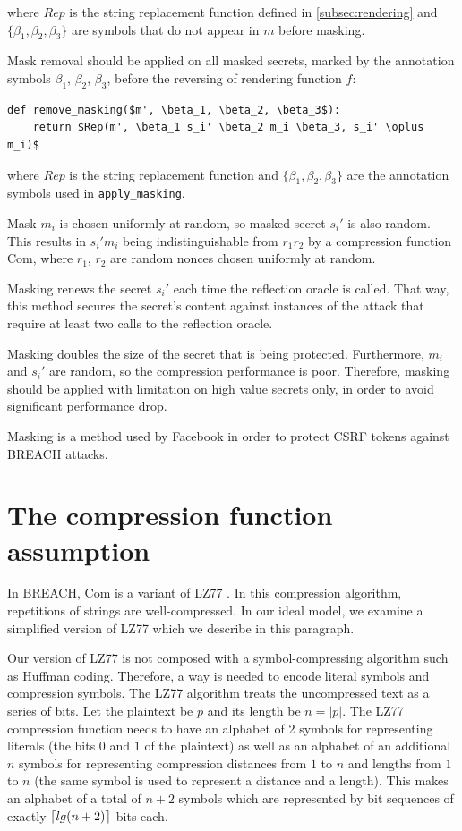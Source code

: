 \documentclass[conference, letterpaper, 10pt]{IEEEtran}
\DeclarePairedDelimiter{\ceil}{\lceil}{\rceil}
\begin{document}
where $Rep$ is the string replacement function defined in
\ref{subsec:rendering} and $\{\beta_1, \beta_2, \beta_3\}$ are symbols that do not
appear in $m$ before masking.

Mask removal should be applied on all masked secrets, marked by the annotation
symbols $\beta_1$, $\beta_2$, $\beta_3$, before the reversing of rendering function $f$:

\begin{lstlisting}[texcl,mathescape,basicstyle=\small]
def remove_masking($m', \beta_1, \beta_2, \beta_3$):
    return $Rep(m', \beta_1 s_i' \beta_2 m_i \beta_3, s_i' \oplus m_i)$
\end{lstlisting}

where $Rep$ is the string replacement function and $\{\beta_1, \beta_2,
\beta_3\}$ are the annotation symbols used in \texttt{apply\_masking}.

Mask $m_i$ is chosen uniformly at random, so masked secret $s_i'$ is also
random. This results in $s_i' m_i$ being indistinguishable from $r_1 r_2$ by a
compression function $\textrm{Com}$, where $r_1$, $r_2$ are random nonces chosen
uniformly at random.

Masking renews the secret $s_i'$ each time the reflection oracle is called. That
way, this method secures the secret's content against instances of the attack
that require at least two calls to the reflection oracle.

Masking doubles the size of the secret that is being protected. Furthermore,
$m_i$ and $s_i'$ are random, so the compression performance is poor. Therefore,
masking should be applied with limitation on high value secrets only, in order
to avoid significant performance drop.

Masking is a method used by Facebook \cite{c11} in order to protect CSRF tokens
against BREACH attacks.

\appendices

\section{The compression function assumption}\label{subsec:comfuncassumption}

In BREACH, $\textrm{Com}$ is a variant of LZ77 \cite{c9}. In this compression algorithm,
repetitions of strings are well-compressed. In our ideal model, we examine a
simplified version of LZ77 which we describe in this paragraph.

Our version of LZ77 is not composed with a symbol-compressing algorithm such as
Huffman coding. Therefore, a way is needed to encode literal symbols and
compression symbols. The LZ77 algorithm treats the uncompressed text as a
series of bits. Let the plaintext be $p$ and its length be $n = |p|$. The LZ77
compression function needs to have an alphabet of 2 symbols for representing
literals (the bits $0$ and $1$ of the plaintext) as well as an alphabet of an
additional $n$ symbols for representing compression distances from $1$ to $n$
and lengths from $1$ to $n$ (the same symbol is used to represent a distance
and a length). This makes an alphabet of a total of $n + 2$ symbols which are
represented by bit sequences of exactly $\ceil{lg(n + 2)}$ bits each.
\end{document}
